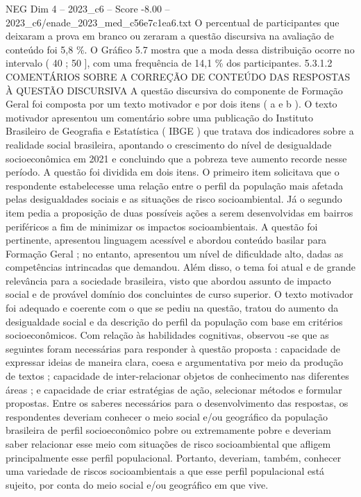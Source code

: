 \begin{textsample}{NEG Dim 4 – 2023\_c6 – Score -8.00 – 2023\_c6/enade\_2023\_med\_c56e7c1ea6.txt}
O percentual de participantes que deixaram a prova em branco ou zeraram a questão discursiva na avaliação de conteúdo foi 5,8 \%.
O Gráfico 5.7 mostra que a moda dessa distribuição ocorre no intervalo ( 40 ; 50 ], com uma frequência de 14,1 \% dos participantes. 5.3.1.2 COMENTÁRIOS SOBRE A CORREÇÃO DE CONTEÚDO DAS RESPOSTAS À QUESTÃO DISCURSIVA A questão discursiva do componente de Formação Geral foi composta por um texto motivador e por dois itens ( a e b ).
O texto motivador apresentou um comentário sobre uma publicação do Instituto Brasileiro de Geografia e Estatística ( IBGE ) que tratava dos indicadores sobre a realidade social brasileira, apontando o crescimento do nível de desigualdade socioeconômica em 2021 e concluindo que a pobreza teve aumento recorde nesse período.
A questão foi dividida em dois itens.
O primeiro item solicitava que o respondente estabelecesse uma relação entre o perfil da população mais afetada pelas desigualdades sociais e as situações de risco socioambiental.
Já o segundo item pedia a proposição de duas possíveis ações a serem desenvolvidas em bairros periféricos a fim de minimizar os impactos socioambientais.
A questão foi pertinente, apresentou linguagem acessível e abordou conteúdo basilar para Formação Geral ; no entanto, apresentou um nível de dificuldade alto, dadas as competências intrincadas que demandou.
Além disso, o tema foi atual e de grande relevância para a sociedade brasileira, visto que abordou assunto de impacto social e de provável domínio dos concluintes de curso superior.
O texto motivador foi adequado e coerente com o que se pediu na questão, tratou do aumento da desigualdade social e da descrição do perfil da população com base em critérios socioeconômicos.
Com relação às habilidades cognitivas, observou -se que as seguintes foram necessárias para responder à questão proposta : capacidade de expressar ideias de maneira clara, coesa e argumentativa por meio da produção de textos ; capacidade de inter-relacionar objetos de conhecimento nas diferentes áreas ; e capacidade de criar estratégias de ação, selecionar métodos e formular propostas.
Entre os saberes necessários para o desenvolvimento das respostas, os respondentes deveriam conhecer o meio social e/ou geográfico da população brasileira de perfil socioeconômico pobre ou extremamente pobre e deveriam saber relacionar esse meio com situações de risco socioambiental que afligem principalmente esse perfil populacional.
Portanto, deveriam, também, conhecer uma variedade de riscos socioambientais a que esse perfil populacional está sujeito, por conta do meio social e/ou geográfico em que vive.

\end{textsample}
